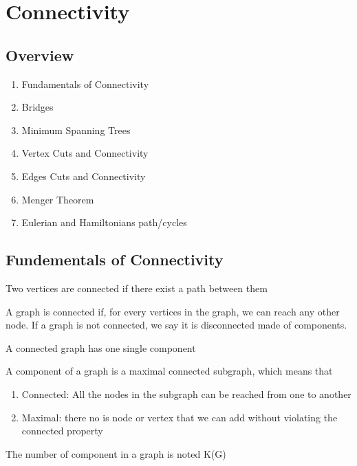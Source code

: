 \documentclass{article}
\begin{document}
\section{Connectivity}

\subsection{Overview}%
\label{sub:Overview}

\begin{enumerate}
    \item Fundamentals of Connectivity
    \item Bridges
    \item Minimum Spanning Trees
    \item Vertex Cuts and Connectivity
    \item Edges Cuts and Connectivity
    \item Menger Theorem
    \item Eulerian and Hamiltonians path/cycles
\end{enumerate}

\subsection{Fundementals of Connectivity}

\begin{definition}
    Two vertices are connected if there exist a path between them
\end{definition}

\begin{definition}
    A graph is connected if, for every vertices in the graph, we can
    reach any other node. If a graph is not connected, we say it is
    disconnected made of components.
\end{definition}

\begin{remark}
    A connected graph has one single component
\end{remark}

\begin{definition}
    A component of a graph is a maximal connected subgraph, which means
    that
    \begin{enumerate}
	\item Connected: All the nodes in the subgraph can be reached
	    from one to another
	\item Maximal: there no is node or vertex that we can add without
	    violating the connected property
    \end{enumerate}
    The number of component in a graph is noted K(G)
\end{definition}
\end{document}
